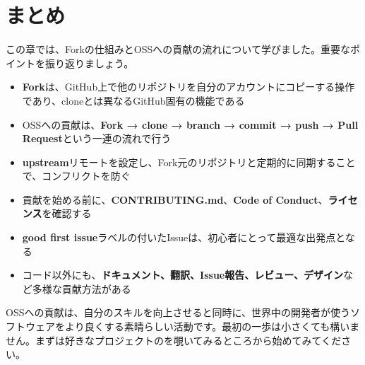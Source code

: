 \section{まとめ}

この章では、Forkの仕組みとOSSへの貢献の流れについて学びました。重要なポイントを振り返りましょう。

\begin{itemize}
  \item \textbf{Fork}は、GitHub上で他のリポジトリを自分のアカウントにコピーする操作であり、cloneとは異なるGitHub固有の機能である
  \item OSSへの貢献は、\textbf{Fork → clone → branch → commit → push → Pull Request}という一連の流れで行う
  \item \textbf{upstream}リモートを設定し、Fork元のリポジトリと定期的に同期することで、コンフリクトを防ぐ
  \item 貢献を始める前に、\textbf{CONTRIBUTING.md}、\textbf{Code of Conduct}、\textbf{ライセンス}を確認する
  \item \textbf{good first issue}ラベルの付いたIssueは、初心者にとって最適な出発点となる
  \item コード以外にも、\textbf{ドキュメント、翻訳、Issue報告、レビュー、デザイン}など多様な貢献方法がある
\end{itemize}

OSSへの貢献は、自分のスキルを向上させると同時に、世界中の開発者が使うソフトウェアをより良くする素晴らしい活動です。最初の一歩は小さくても構いません。まずは好きなプロジェクトのを覗いてみるところから始めてみてください。
